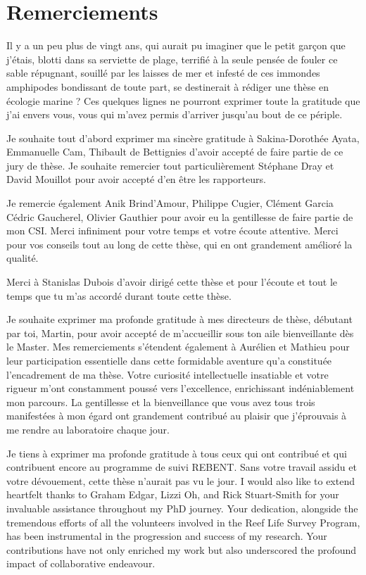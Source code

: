 \begin{refsection}

\hypertarget{remerciements}{%
\chapter*{Remerciements}\label{remerciements}}

Il y a un peu plus de vingt ans, qui aurait pu imaginer que le petit
garçon que j'étais, blotti dans sa serviette de plage, terrifié à la
seule pensée de fouler ce sable répugnant, souillé par les laisses de
mer et infesté de ces immondes amphipodes bondissant de toute part, se
destinerait à rédiger une thèse en écologie marine ? Ces quelques lignes
ne pourront exprimer toute la gratitude que j'ai envers vous, vous qui
m'avez permis d'arriver jusqu'au bout de ce périple.

Je souhaite tout d'abord exprimer ma sincère gratitude à Sakina-Dorothée
Ayata, Emmanuelle Cam, Thibault de Bettignies d'avoir accepté de faire
partie de ce jury de thèse. Je souhaite remercier tout particulièrement
Stéphane Dray et David Mouillot pour avoir accepté d'en être les
rapporteurs.

Je remercie également Anik Brind'Amour, Philippe Cugier, Clément Garcia
Cédric Gaucherel, Olivier Gauthier pour avoir eu la gentillesse de faire
partie de mon CSI. Merci infiniment pour votre temps et votre écoute
attentive. Merci pour vos conseils tout au long de cette thèse, qui en
ont grandement amélioré la qualité.

Merci à Stanislas Dubois d'avoir dirigé cette thèse et pour l'écoute et
tout le temps que tu m'as accordé durant toute cette thèse.

Je souhaite exprimer ma profonde gratitude à mes directeurs de thèse,
débutant par toi, Martin, pour avoir accepté de m'accueillir sous ton
aile bienveillante dès le Master. Mes remerciements s'étendent également
à Aurélien et Mathieu pour leur participation essentielle dans cette
formidable aventure qu'a constituée l'encadrement de ma thèse. Votre
curiosité intellectuelle insatiable et votre rigueur m'ont constamment
poussé vers l'excellence, enrichissant indéniablement mon parcours. La
gentillesse et la bienveillance que vous avez tous trois manifestées à
mon égard ont grandement contribué au plaisir que j'éprouvais à me
rendre au laboratoire chaque jour.

Je tiens à exprimer ma profonde gratitude à tous ceux qui ont contribué
et qui contribuent encore au programme de suivi REBENT. Sans votre
travail assidu et votre dévouement, cette thèse n'aurait pas vu le jour.
I would also like to extend heartfelt thanks to Graham Edgar, Lizzi Oh,
and Rick Stuart-Smith for your invaluable assistance throughout my PhD
journey. Your dedication, alongside the tremendous efforts of all the
volunteers involved in the Reef Life Survey Program, has been
instrumental in the progression and success of my research. Your
contributions have not only enriched my work but also underscored the
profound impact of collaborative endeavour.


\end{refsection}
